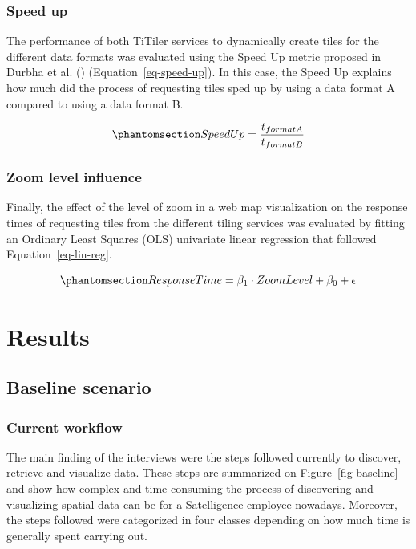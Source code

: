 \documentclass[
  oneside,
  open=any]{scrbook}
\begin{document}
\subsection{Speed up}\label{speed-up}

The performance of both TiTiler services to dynamically create tiles for
the different data formats was evaluated using the Speed Up metric
proposed in Durbha et al. ()
(Equation~\ref{eq-speed-up}). In this case, the Speed Up explains how
much did the process of requesting tiles sped up by using a data format
A compared to using a data format B.

\begin{equation}\phantomsection\label{eq-speed-up}{ SpeedUp = \frac{t_{format A}}{t_{format B}} }\end{equation}

\subsection{Zoom level influence}\label{zoom-level-influence}

Finally, the effect of the level of zoom in a web map visualization on
the response times of requesting tiles from the different tiling
services was evaluated by fitting an Ordinary Least Squares (OLS)
univariate linear regression that followed Equation~\ref{eq-lin-reg}.

\begin{equation}\phantomsection\label{eq-lin-reg}{ ResponseTime = \beta_1 \cdot ZoomLevel + \beta_0 + \epsilon }\end{equation}

\chapter{Results}\label{results}

\section{Baseline scenario}\label{baseline-scenario}

\subsection{Current workflow}\label{current-workflow}

The main finding of the interviews were the steps followed currently to
discover, retrieve and visualize data. These steps are summarized on
Figure~\ref{fig-baseline} and show how complex and time consuming the
process of discovering and visualizing spatial data can be for a
Satelligence employee nowadays. Moreover, the steps followed were
categorized in four classes depending on how much time is generally
spent carrying out.
\end{document}
